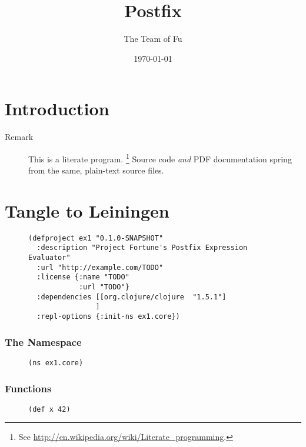 \documentclass[11pt]{article}
\author{The Team of Fu}
\date{\today}
\title{Postfix}
\begin{document}
\maketitle
\tableofcontents


\section{Introduction}
\label{sec-1}
\begin{description}
\item[{Remark}] This is a literate program. 
\footnote{See \url{http://en.wikipedia.org/wiki/Literate_programming}.} 
Source code \emph{and} PDF documentation spring
from the same, plain-text source files.
\end{description}
\section{Tangle to Leiningen}
\label{sec-2}

\begin{figure}[H]
\label{project-file}
\begin{verbatim}
(defproject ex1 "0.1.0-SNAPSHOT"
  :description "Project Fortune's Postfix Expression Evaluator"
  :url "http://example.com/TODO"
  :license {:name "TODO"
            :url "TODO"}
  :dependencies [[org.clojure/clojure  "1.5.1"]
                ]
  :repl-options {:init-ns ex1.core})
\end{verbatim}
\end{figure}

\subsubsection{The Namespace}
\label{sec-2-0-1}

\begin{figure}[H]
\label{main-namespace}
\begin{verbatim}
(ns ex1.core)
\end{verbatim}
\end{figure}
\subsubsection{Functions}
\label{sec-2-0-2}

\begin{figure}[H]
\label{main-functions}
\begin{verbatim}
(def x 42)
\end{verbatim}
\end{figure}
\end{document}
